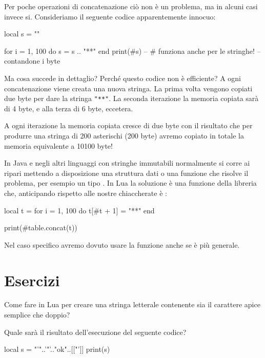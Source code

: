 Per poche operazioni di concatenazione ciò non è un problema, ma in alcuni casi
invece si. Consideriamo il seguente codice apparentemente innocuo:
\begin{lines}
local s = ""

for i = 1, 100 do
    s = s .. "**"
end
print(#s) -- # funziona anche per le stringhe!
--             contandone i byte
\end{lines}

Ma cosa succede in dettaglio? Perché questo codice non è efficiente? A ogni
concatenazione viene creata una nuova stringa. La prima volta vengono copiati
due byte per dare la stringa \verb|"**"|. La seconda iterazione la memoria
copiata sarà di 4 byte, e alla terza di 6 byte, eccetera.

A ogni iterazione la memoria copiata cresce di due byte con il risultato che per
produrre una stringa di 200 asterischi (200 byte) avremo copiato in totale la
memoria equivalente a 10100 byte!

In Java e negli altri linguaggi con stringhe immutabili normalmente si corre ai
ripari mettendo a disposizione una struttura dati o una funzione che risolve il
problema, per esempio un tipo . In Lua la soluzione è una
funzione della libreria  che, anticipando rispetto alle nostre
chiaccherate è :
\begin{lines}
local t = {}
for i = 1, 100 do
    t[#t + 1] = "**"
end

print(#table.concat(t))
\end{lines}

Nel caso specifico avremo dovuto usare la funzione
 anche se  è più generale.


\section{Esercizi}

\begin{Exercise}[label=string-01]
Come fare in Lua per creare una stringa letterale contenente sia il
carattere apice semplice che doppio?
\end{Exercise}

\begin{Exercise}[label=string-02]
Quale sarà il risultato dell'esecuzione del seguente codice?
\begin{lines}
local s = "'"..'"'.."ok"..[["']]
print(s)
\end{lines}
\end{Exercise}

